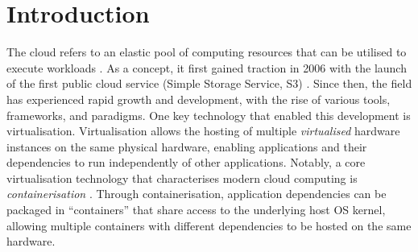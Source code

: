 








\newpage

\tableofcontents


\newpage


\chapter{Introduction}

The cloud refers to an elastic pool of computing resources that can be utilised to execute workloads \cite{editorCloudComputingGlossary}. As a concept, it first gained traction in 2006 with the launch of the first public cloud service (Simple Storage Service, S3) \cite{liuReviewDigitalTwin2021}. Since then, the field has experienced rapid growth and development, with the rise of various tools, frameworks, and paradigms. One key technology that enabled this development is virtualisation. Virtualisation allows the hosting of multiple \textit{virtualised} hardware instances on the same physical hardware, enabling applications and their dependencies to run independently of other applications. Notably, a core virtualisation technology that characterises modern cloud computing is \textit{containerisation} \cite{pereiraferreiraPerformanceEvaluationContainers2019}. Through containerisation, application dependencies can be packaged in “containers” that share access to the underlying host OS kernel, allowing multiple containers with different dependencies to be hosted on the same hardware.


